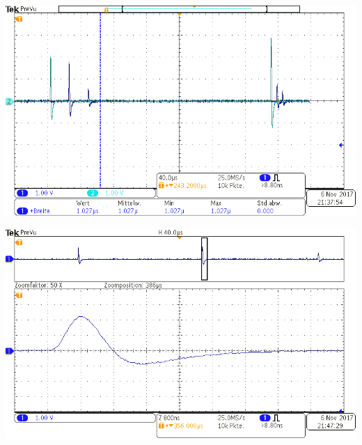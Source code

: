 \begin{multicols}{2}
\begin{center}
        \label{fig:OsciSignal2}
    \end{center}
\endminipage
%
\vspace{10mm}
%
\minipage{\linewidth}
    \begin{center}
        \captionsetup{type=figure}
        \begin{adjustbox}{max width=\linewidth, keepaspectratio}
            \includegraphics[]{png/tek00003}
        \end{adjustbox}
        \label{fig:OsciSignal1and2}
    \end{center}
\endminipage
%
\vspace{10mm}
%
\minipage{\linewidth}
    \begin{center}
        \captionsetup{type=figure}
        \begin{adjustbox}{max width=\linewidth, keepaspectratio}
            \includegraphics[]{png/tek00004}
        \end{adjustbox}

\end{center}
\end{multicols}
